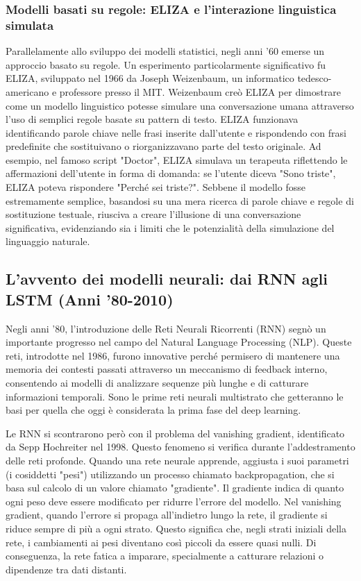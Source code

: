 \documentclass[target=mst,aauheader=,style=]{thud}
\begin{document}
\subsubsection{Modelli basati su regole: ELIZA e l’interazione linguistica simulata}
Parallelamente allo sviluppo dei modelli statistici, negli anni ’60 emerse un approccio basato su regole. Un esperimento particolarmente significativo fu ELIZA, sviluppato nel 1966 da Joseph Weizenbaum, un informatico tedesco-americano e professore presso il MIT. Weizenbaum creò ELIZA per dimostrare come un modello linguistico potesse simulare una conversazione umana attraverso l’uso di semplici regole basate su pattern di testo. ELIZA funzionava identificando parole chiave nelle frasi inserite dall’utente e rispondendo con frasi predefinite che sostituivano o riorganizzavano parte del testo originale. Ad esempio, nel famoso script "Doctor", ELIZA simulava un terapeuta riflettendo le affermazioni dell’utente in forma di domanda: se l’utente diceva "Sono triste", ELIZA poteva rispondere "Perché sei triste?". Sebbene il modello fosse estremamente semplice, basandosi su una mera ricerca di parole chiave e regole di sostituzione testuale, riusciva a creare l’illusione di una conversazione significativa, evidenziando sia i limiti che le potenzialità della simulazione del linguaggio naturale.\cite{weizenbaum_1996}

\subsection{L’avvento dei modelli neurali: dai RNN agli LSTM (Anni ’80-2010)}
Negli anni '80, l'introduzione delle Reti Neurali Ricorrenti (RNN) segnò un importante progresso nel campo del Natural Language Processing (NLP). Queste reti, introdotte nel 1986, furono innovative perché permisero di mantenere una memoria dei contesti passati attraverso un meccanismo di feedback interno, consentendo ai modelli di analizzare sequenze più lunghe e di catturare informazioni temporali. Sono le prime reti neurali multistrato che getteranno le basi per quella che oggi è considerata la prima fase del deep learning.\cite{su_2024_large_language_models_forecasting}

Le RNN si scontrarono però con il problema del vanishing gradient, identificato da Sepp Hochreiter nel 1998. Questo fenomeno si verifica durante l'addestramento delle reti profonde. Quando una rete neurale apprende, aggiusta i suoi parametri (i cosiddetti "pesi") utilizzando un processo chiamato backpropagation, che si basa sul calcolo di un valore chiamato "gradiente". Il gradiente indica di quanto ogni peso deve essere modificato per ridurre l'errore del modello. Nel vanishing gradient, quando l'errore si propaga all'indietro lungo la rete, il gradiente si riduce sempre di più a ogni strato. Questo significa che, negli strati iniziali della rete, i cambiamenti ai pesi diventano così piccoli da essere quasi nulli. Di conseguenza, la rete fatica a imparare, specialmente a catturare relazioni o dipendenze tra dati distanti.\cite{hochreiter_1998}
\end{document}
